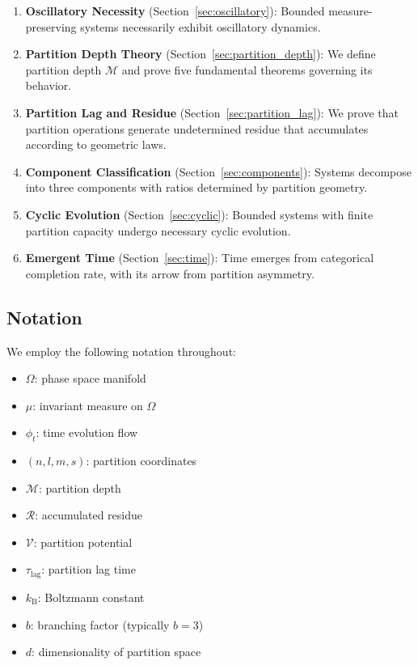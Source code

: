 \documentclass[twocolumn,10pt,a4paper]{article}
\theoremstyle{definition}
\theoremstyle{remark}
\newcommand{\kB}{k_{\mathrm{B}}}
\newcommand{\Depth}{\mathcal{M}}
\newcommand{\Residue}{\mathcal{R}}
\newcommand{\Potential}{\mathcal{V}}
\newcommand{\Lag}{\tau_{\mathrm{lag}}}
\begin{document}
\begin{enumerate}[label=(\roman*)]
    \item \textbf{Oscillatory Necessity} (Section~\ref{sec:oscillatory}): Bounded measure-preserving systems necessarily exhibit oscillatory dynamics.

    \item \textbf{Partition Depth Theory} (Section~\ref{sec:partition_depth}): We define partition depth $\Depth$ and prove five fundamental theorems governing its behavior.

    \item \textbf{Partition Lag and Residue} (Section~\ref{sec:partition_lag}): We prove that partition operations generate undetermined residue that accumulates according to geometric laws.

    \item \textbf{Component Classification} (Section~\ref{sec:components}): Systems decompose into three components with ratios determined by partition geometry.

    \item \textbf{Cyclic Evolution} (Section~\ref{sec:cyclic}): Bounded systems with finite partition capacity undergo necessary cyclic evolution.

    \item \textbf{Emergent Time} (Section~\ref{sec:time}): Time emerges from categorical completion rate, with its arrow from partition asymmetry.
\end{enumerate}

\subsection{Notation}

We employ the following notation throughout:
\begin{itemize}
    \item $\Omega$: phase space manifold
    \item $\mu$: invariant measure on $\Omega$
    \item $\phi_t$: time evolution flow
    \item $(n, l, m, s)$: partition coordinates
    \item $\Depth$: partition depth
    \item $\Residue$: accumulated residue
    \item $\Potential$: partition potential
    \item $\Lag$: partition lag time
    \item $\kB$: Boltzmann constant
    \item $b$: branching factor (typically $b = 3$)
    \item $d$: dimensionality of partition space
\end{itemize}
\end{document}
